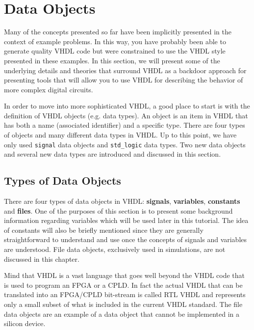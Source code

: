 %
%
\chapter{Data Objects}

Many of the concepts presented so far have been implicitly presented in the context of example problems. In this way, you have probably been able to generate quality VHDL code but were constrained to use the VHDL style presented in these examples. In this section, we will present some of the underlying details and theories that surround VHDL as a backdoor approach for presenting tools that will allow you to use VHDL for describing the behavior of more complex digital circuits.

In order to move into more sophisticated VHDL, a good place to start is with the definition of VHDL objects (e.g. data types). An object is an item in VHDL that has both a name (associated identifier) and a specific type. There are four types of objects and many different data types in VHDL. Up to this point, we have only used \texttt{signal} data objects and \texttt{std\_logic} data types. Two new data objects and several new data types are introduced and discussed in this section.

\section{Types of Data Objects}
There are four types of data objects in VHDL: \textbf{signals}, \textbf{variables}, \textbf{constants} and \textbf{files}. One of the purposes of this section is to present some background information regarding variables which will be used later in this tutorial. The idea of constants will also be briefly mentioned since they are generally straightforward to understand and use once the concepts of signals and variables are understood. File data objects, exclusively used in simulations, are not discussed in this chapter.

Mind that VHDL is a vast language that goes well beyond the VHDL code that is used to program an FPGA or a CPLD. In fact the actual VHDL that can be translated into an FPGA/CPLD bit-stream is called RTL VHDL and represents only a small subset of what is included in the current VHDL standard. The file  data objects are an example of a data object that cannot be implemented in a silicon device.

